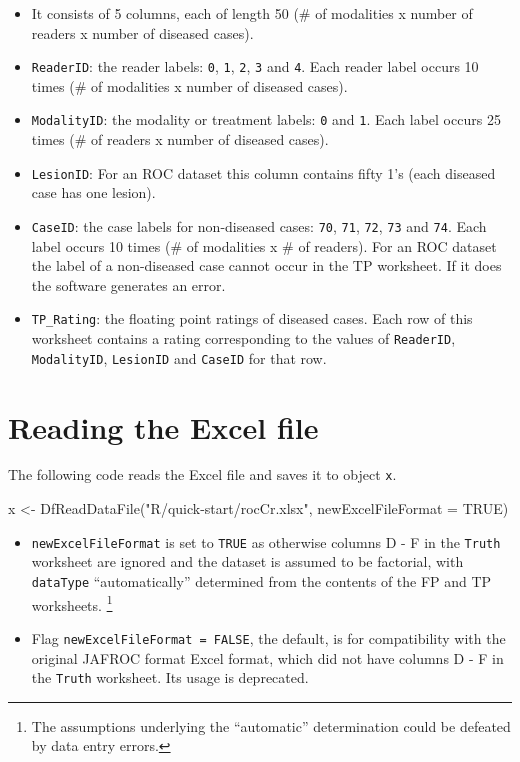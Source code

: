 \documentclass[
]{book}
\newenvironment{Shaded}{\begin{snugshade}}{\end{snugshade}}
\newcommand{\AttributeTok}[1]{\textcolor[rgb]{0.77,0.63,0.00}{#1}}
\newcommand{\ConstantTok}[1]{\textcolor[rgb]{0.00,0.00,0.00}{#1}}
\newcommand{\FunctionTok}[1]{\textcolor[rgb]{0.00,0.00,0.00}{#1}}
\newcommand{\NormalTok}[1]{#1}
\newcommand{\OtherTok}[1]{\textcolor[rgb]{0.56,0.35,0.01}{#1}}
\newcommand{\StringTok}[1]{\textcolor[rgb]{0.31,0.60,0.02}{#1}}
\providecommand{\tightlist}{%
  \setlength{\itemsep}{0pt}\setlength{\parskip}{0pt}}
\begin{document}
\begin{itemize}
\tightlist
\item
  It consists of 5 columns, each of length 50 (\# of modalities x number of readers x number of diseased cases).
\item
  \texttt{ReaderID}: the reader labels: \texttt{0}, \texttt{1}, \texttt{2}, \texttt{3} and \texttt{4}. Each reader label occurs 10 times (\# of modalities x number of diseased cases).
\item
  \texttt{ModalityID}: the modality or treatment labels: \texttt{0} and \texttt{1}. Each label occurs 25 times (\# of readers x number of diseased cases).
\item
  \texttt{LesionID}: For an ROC dataset this column contains fifty 1's (each diseased case has one lesion).
\item
  \texttt{CaseID}: the case labels for non-diseased cases: \texttt{70}, \texttt{71}, \texttt{72}, \texttt{73} and \texttt{74}. Each label occurs 10 times (\# of modalities x \# of readers). For an ROC dataset the label of a non-diseased case cannot occur in the TP worksheet. If it does the software generates an error.
\item
  \texttt{TP\_Rating}: the floating point ratings of diseased cases. Each row of this worksheet contains a rating corresponding to the values of \texttt{ReaderID}, \texttt{ModalityID}, \texttt{LesionID} and \texttt{CaseID} for that row.
\end{itemize}

\hypertarget{quick-start-roc-read}{%
\section{Reading the Excel file}\label{quick-start-roc-read}}

The following code reads the Excel file and saves it to object \texttt{x}.

\begin{Shaded}
\begin{Highlighting}[]
\NormalTok{x }\OtherTok{\textless{}{-}} \FunctionTok{DfReadDataFile}\NormalTok{(}\StringTok{"R/quick{-}start/rocCr.xlsx"}\NormalTok{, }\AttributeTok{newExcelFileFormat =} \ConstantTok{TRUE}\NormalTok{)}
\end{Highlighting}
\end{Shaded}

\begin{itemize}
\item
  \texttt{newExcelFileFormat} is set to \texttt{TRUE} as otherwise columns D - F in the \texttt{Truth} worksheet are ignored and the dataset is assumed to be factorial, with \texttt{dataType} ``automatically'' determined from the contents of the FP and TP worksheets. \footnote{The assumptions underlying the ``automatic'' determination could be defeated by data entry errors.}
\item
  Flag \texttt{newExcelFileFormat\ =\ FALSE}, the default, is for compatibility with the original JAFROC format Excel format, which did not have columns D - F in the \texttt{Truth} worksheet. Its usage is deprecated.
\end{itemize}
\end{document}
